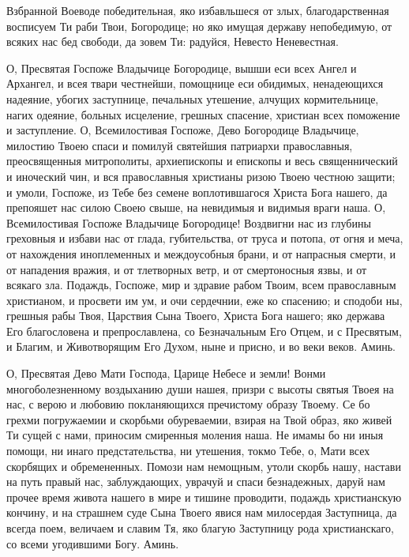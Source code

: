 

Взбранной Воеводе победительная, яко избавльшеся от злых, благодарственная восписуем Ти раби Твои, Богородице; но яко имущая державу непобедимую, от всяких нас бед свободи, да зовем Ти: радуйся, Невесто Неневестная.




О, Пресвятая Госпоже Владычице Богородице, вышши еси всех Ангел и Архангел, и всея твари честнейши, помощнице еси обидимых, ненадеющихся надеяние, убогих заступнице, печальных утешение, алчущих кормительнице, нагих одеяние, больных исцеление, грешных спасение, христиан всех поможение и заступление. О, Всемилостивая Госпоже, Дево Богородице Владычице, милостию Твоею спаси и помилуй святейшия патриархи православныя, преосвященныя митрополиты, архиепископы и епископы и весь священнический и иноческий чин, и вся православныя христианы ризою Твоею честною защити; и умоли, Госпоже, из Тебе без семене воплотившагося Христа Бога нашего, да препояшет нас силою Своею свыше, на невидимыя и видимыя враги наша. О, Всемилостивая Госпоже Владычице Богородице! Воздвигни нас из глубины греховныя и избави нас от глада, губительства, от труса и потопа, от огня и меча, от нахождения иноплеменных и междоусобныя брани, и от напрасныя смерти, и от нападения вражия, и от тлетворных ветр, и от смертоносныя язвы, и от всякаго зла. Подаждь, Госпоже, мир и здравие рабом Твоим, всем православным христианом, и просвети им ум, и очи сердечнии, еже ко спасению; и сподоби ны, грешныя рабы Твоя, Царствия Сына Твоего, Христа Бога нашего; яко держава Его благословена и препрославлена, со Безначальным Его Отцем, и с Пресвятым, и Благим, и Животворящим Его Духом, ныне и присно, и во веки веков. Аминь.


О, Пресвятая Дево Мати Господа, Царице Небесе и земли! Вонми многоболезненному воздыханию души нашея, призри с высоты святыя Твоея на нас, с верою и любовию покланяющихся пречистому образу Твоему. Се бо грехми погружаемии и скорбьми обуреваемии, взирая на Твой образ, яко живей Ти сущей с нами, приносим смиренныя моления наша. Не имамы бо ни иныя помощи, ни инаго предстательства, ни утешения, токмо Тебе, о, Мати всех скорбящих и обремененных. Помози нам немощным, утоли скорбь нашу, настави на путь правый нас, заблуждающих, уврачуй и спаси безнадежных, даруй нам прочее время живота нашего в мире и тишине проводити, подаждь христианскую кончину, и на страшнем суде Сына Твоего явися нам милосердая Заступница, да всегда поем, величаем и славим Тя, яко благую Заступницу рода христианскаго, со всеми угодившими Богу. Аминь.\mychapterending


